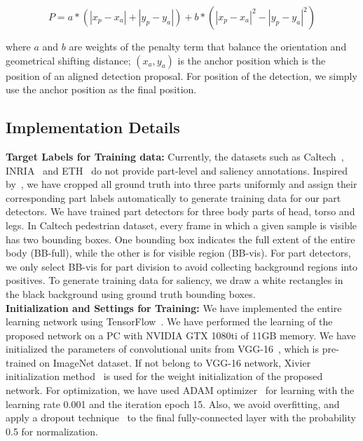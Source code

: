 \documentclass[journal]{IEEEtran}
\begin{document}
\begin{equation}
P=a\ast(|x_{p}-x_{a}|+|y_{p}-y_{a}|)+b\ast(|x_{p}-x_{a}|^{2}-|y_{p}-y_{a}|^{2})
\end{equation}

where $a$ and $b$ are weights of the penalty term that balance the orientation and geometrical shifting distance; $(x_a, y_a)$ is the anchor position which is the position of an aligned detection proposal. For position of the detection, we simply use the anchor position as the final position.

\subsection{Implementation Details}
\label{subsec:Implementation}
\textbf{Target Labels for Training data:} Currently, the datasets such as Caltech~\cite{Dollar2012PAMI}, INRIA~\cite{dalal2005histograms} and ETH~\cite{eth_biwi_00534} do not provide part-level and saliency annotations. Inspired by~\cite{felzenszwalb2008a,felzenszwalb2010object}, we have cropped all ground truth into three parts uniformly and assign their corresponding part labels automatically to generate training data for our part detectors. We have trained part detectors for three body parts of head, torso and legs. In Caltech pedestrian dataset, every frame in which a given sample is visible has two bounding boxes. One bounding box indicates the full extent of the entire body (BB-full), while the other is for visible region (BB-vis). For part detectors, we only select BB-vis for part division to avoid collecting background regions into positives. To generate training data for saliency, we draw a white rectangles in the black background using ground truth bounding boxes. \\

\textbf{Initialization and Settings for Training:} We have implemented the entire learning network using TensorFlow~\cite{tensorflow16tensorflow}. We have performed the learning of the proposed network on a PC with NVIDIA GTX 1080ti of 11GB memory. We have initialized the parameters of convolutional units from VGG-16~\cite{simonyan2014very}, which is pre-trained on ImageNet dataset. If not belong to VGG-16 network, Xivier initialization method~\cite{Xavier10init} is used for the weight initialization of the proposed network. For optimization, we have used ADAM optimizer~\cite{KingmaB14Adam} for learning with the learning rate 0.001 and the iteration epoch 15. Also, we avoid overfitting, and apply a dropout technique~\cite{srivastava14dropout} to the final fully-connected layer with the probability 0.5 for normalization.
\end{document}
